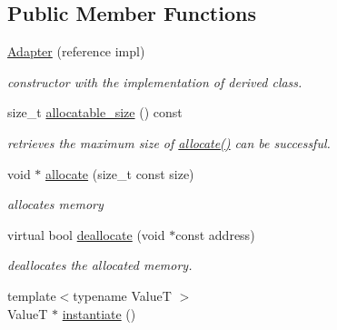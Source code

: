 \subsection*{Public Member Functions}
\begin{DoxyCompactItemize}
\item 
\hypertarget{classhryky_1_1memory_1_1heap_1_1_adapter_a7f9d6a8bed08928631c24e6bf74f581b}{\hyperlink{classhryky_1_1memory_1_1heap_1_1_adapter_a7f9d6a8bed08928631c24e6bf74f581b}{Adapter} (reference impl)}\label{classhryky_1_1memory_1_1heap_1_1_adapter_a7f9d6a8bed08928631c24e6bf74f581b}

\begin{DoxyCompactList}\small\item\em constructor with the implementation of derived class. \end{DoxyCompactList}\item 
size\-\_\-t \hyperlink{classhryky_1_1memory_1_1heap_1_1_base_ae760477ddca7ffdfc1e950946d9179fb}{allocatable\-\_\-size} () const 
\begin{DoxyCompactList}\small\item\em retrieves the maximum size of \hyperlink{classhryky_1_1memory_1_1heap_1_1_base_a068b1ee5b4e759df5e19dff37eecaf92}{allocate()} can be successful. \end{DoxyCompactList}\item 
void $\ast$ \hyperlink{classhryky_1_1memory_1_1heap_1_1_base_a068b1ee5b4e759df5e19dff37eecaf92}{allocate} (size\-\_\-t const size)
\begin{DoxyCompactList}\small\item\em allocates memory \end{DoxyCompactList}\item 
virtual bool \hyperlink{classhryky_1_1memory_1_1heap_1_1_base_ac9629d3eb869729c475d9c8edf28461c}{deallocate} (void $\ast$const address)
\begin{DoxyCompactList}\small\item\em deallocates the allocated memory. \end{DoxyCompactList}\item 
\hypertarget{classhryky_1_1memory_1_1heap_1_1_base_a147663574da9f0202cbfbc139358ae6b}{{\footnotesize template$<$typename Value\-T $>$ }\\Value\-T $\ast$ \hyperlink{classhryky_1_1memory_1_1heap_1_1_base_a147663574da9f0202cbfbc139358ae6b}{instantiate} ()}\label{classhryky_1_1memory_1_1heap_1_1_base_a147663574da9f0202cbfbc139358ae6b}


\end{DoxyCompactItemize}
